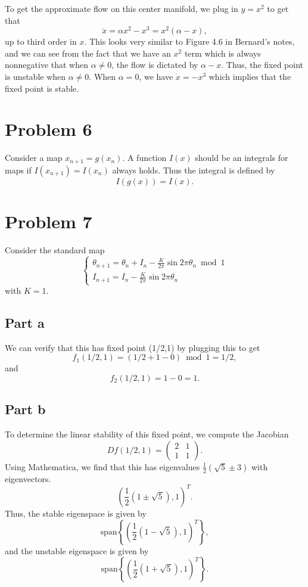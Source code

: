 \documentclass{article}
\begin{document}
To get the approximate flow on this center manifold, we plug in $y=x^2$ to get that 
\[
\dot x= \alpha x^2 -x^3=x^2(\alpha-x),
\]
up to third order in $x$. This looks very similar to Figure 4.6 in Bernard's notes, and we can see from the fact that we have an $x^2$ term which is always nonnegative that when $\alpha\neq0$, the flow is dictated by $\alpha-x$. Thus, the fixed point is unstable when $\alpha\neq0$. When $\alpha=0$, we have $\dot{x}=-x^3$ which implies that the fixed point is stable.

\section{Problem 6}
Consider a map $x_{n+1}=g(x_n)$. A function $I(x)$ should be an integrals for maps if $I(x_{n+1})=I(x_n)$ always holds. Thus the integral is defined by
\[
I(g(x))=I(x).
\]

\section{Problem 7}
Consider the standard map 
\begin{equation*}
	\left\{\begin{array}{l}
		\theta_{n+1}=\theta_{n}+I_{n}-\frac{K}{2 \pi} \sin 2 \pi \theta_{n} \bmod 1 \\
		I_{n+1}=I_{n}-\frac{K}{2 \pi} \sin 2 \pi \theta_{n}
	\end{array}\right.
\end{equation*}
with $K=1$.
\subsection{Part a}
We can verify that this has fixed point (1/2,1) by plugging this to get 
\begin{equation*}
	f_1(1/2,1)=(1/2+1-0)\bmod1=1/2,
\end{equation*}
and 
\begin{equation*}
	f_2(1/2,1)=1-0=1.
\end{equation*}
\subsection{Part b}
To determine the linear stability of this fixed point, we compute the Jacobian
\begin{equation*}
	Df(1/2,1)=\begin{pmatrix}2&1\\1&1\end{pmatrix}.
\end{equation*}
Using Mathematica, we find that this has eigenvalues $\frac{1}{2} \left(\sqrt{5}\pm3\right)$ with eigenvectors. 
\[
\left(\frac{1}{2} \left(1\pm\sqrt{5}\right),1\right)^T.
\]
Thus, the stable eigenspace is given by
\[
\text{span}\left\{\left(\frac{1}{2} \left(1-\sqrt{5}\right),1\right)^T\right\},
\]
and the unstable eigenspace is given by
\[
\text{span}\left\{\left(\frac{1}{2} \left(1+\sqrt{5}\right),1\right)^T\right\}.
\]
\end{document}
